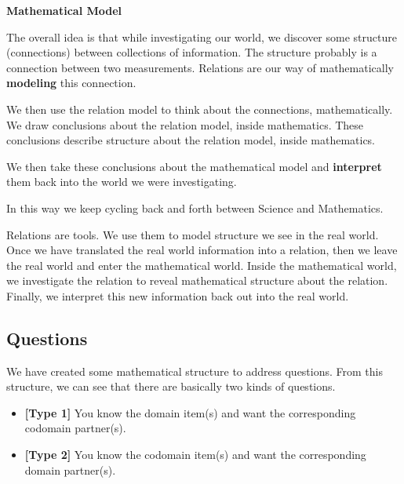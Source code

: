 \documentclass{ximera}
\begin{document}
\begin{idea} \textbf{\textcolor{blue!55!black}{Mathematical Model}} 

The overall idea is that while investigating our world, we discover some structure (connections) between collections of information.  The structure probably is a connection between two measurements. Relations are our way of mathematically \textbf{\textcolor{blue!55!black}{modeling}} this connection.

We then use the relation model to think about the connections, mathematically.  We draw conclusions about the relation model, inside mathematics. These conclusions describe structure about the relation model, inside mathematics.

We then take these conclusions about the mathematical model and \textbf{\textcolor{purple!85!blue}{interpret}} them back into the world we were investigating.

In this way we keep cycling back and forth between Science and Mathematics.

\end{idea}

Relations are tools.  We use them to model structure we see in the real world. Once we have translated the real world information into a relation, then we leave the real world and enter the mathematical world. Inside the mathematical world, we investigate the relation to reveal mathematical structure about the relation.  Finally, we interpret this new information back out into the real world. 








\subsection*{Questions}


We have created some mathematical structure to address questions. From this structure, we can see that there are basically two kinds of questions.

\begin{itemize}
\item \textbf{\textcolor{blue!55!black}{[Type 1]}} You know the domain item(s) and want the corresponding codomain partner(s).
\item \textbf{\textcolor{blue!55!black}{[Type 2]}} You know the codomain item(s) and want the corresponding domain partner(s).
\end{itemize}
\end{document}

